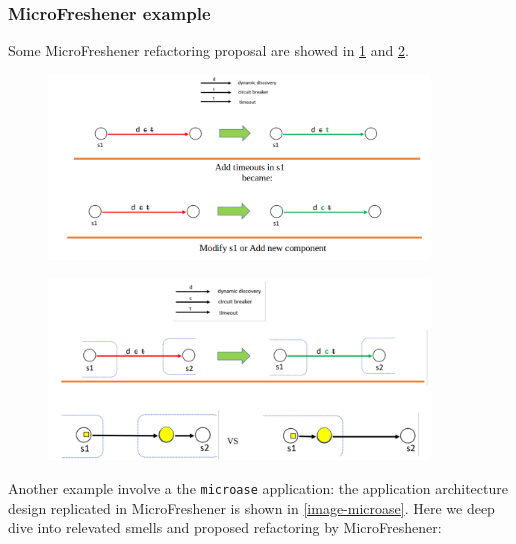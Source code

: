 \documentclass[10pt,a4paper]{report}
\begin{document}
\subsubsection{MicroFreshener example}
Some MicroFreshener refactoring proposal are showed in \ref{image-microfreshener} and \ref{image-microfreshener2}. \\
\begin{figure}[h]
	\centering
	\includegraphics[width=0.9\textwidth]{image_example_microfreshener}
	\caption{}
	\label{image-microfreshener}
\end{figure}
\begin{figure}[h]
	\centering
	\includegraphics[width=0.9\textwidth]{image-example-microfreshener-2}
	\caption{}
	\label{image-microfreshener2}
\end{figure}
Another example involve a the \texttt{microase} application: the application architecture design replicated in MicroFreshener is shown in \ref{image-microase}.
Here we deep dive into relevated smells and proposed refactoring by MicroFreshener:
\end{document}
